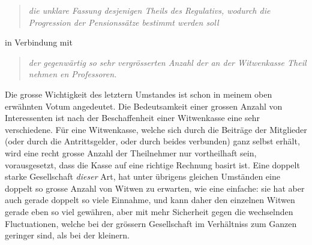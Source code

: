 \begin{quote}\textit{die unklare Fassung desjenigen Theils des Regulativs, wodurch die Progression der Pensionssätze bestimmt werden soll}\end{quote}
in Verbindung mit
\begin{quote}\raggedright\textit{der gegenwärtig so sehr vergrösserten Anzahl der an der Witwenkasse Theil nehmen en Professoren.}\end{quote}
\noindent\hspace*{\parindent}Die grosse Wichtigkeit des letztern Umstandes ist schon in meinem oben erwähnten Votum angedeutet. Die Bedeutsamkeit einer grossen Anzahl von Interessenten ist nach der Beschaffenheit einer Witwenkasse eine sehr verschiedene. Für eine Witwenkasse, welche sich durch die Beiträge der Mitglieder (oder durch die Antrittsgelder, oder durch beides verbunden) ganz selbst erhält, wird eine recht grosse Anzahl der Theilnehmer nur vortheilhaft sein, vorausgesetzt, dass die Kasse auf eine richtige Rechnung basirt ist. Eine doppelt starke Gesellschaft \textit{dieser} Art, hat unter übrigens gleichen Umständen eine doppelt so grosse Anzahl von Witwen zu erwarten, wie eine einfache: sie hat aber auch gerade doppelt so viele Einnahme, und kann daher den einzelnen Witwen gerade eben so viel gewähren, aber mit mehr Sicherheit gegen die wechselnden Fluctuationen, welche bei der grössern Gesellschaft im Verhältniss zum Ganzen geringer sind, als bei der kleinern.

